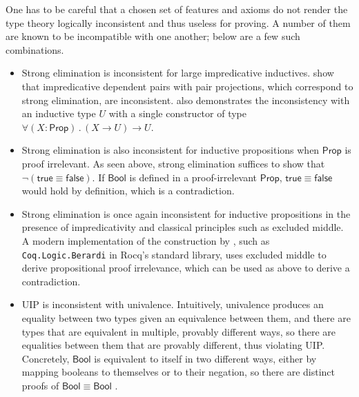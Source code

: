 \documentclass{article}
\newcommand{\kw}[1]{\mathsf{#1}}
\newcommand{\code}[1]{\texttt{#1}}
\begin{document}
One has to be careful that a chosen set of features and axioms
do not render the type theory logically inconsistent and thus useless for proving.
A number of them are known to be incompatible with one another;
below are a few such combinations.

\begin{itemize}[noitemsep,topsep=0pt]
  \item Strong elimination is inconsistent for large impredicative inductives.
    \citet{strong-pair} show that impredicative dependent pairs with pair projections,
    which correspond to strong elimination, are inconsistent.
    \citet{trees} also demonstrates the inconsistency with an inductive type $U$
    with a single constructor of type
    $\forall (X : \kw{Prop})\mathpunct{.} (X \to U) \to U$.
  \item Strong elimination is also inconsistent for inductive propositions
    when $\kw{Prop}$ is proof irrelevant.
    As seen above, strong elimination suffices to show that $\neg (\kw{true} \equiv \kw{false})$.
    If $\kw{Bool}$ is defined in a proof-irrelevant $\kw{Prop}$,
    $\kw{true} \equiv \kw{false}$ would hold by definition,
    which is a contradiction.
  \item Strong elimination is once again inconsistent for inductive propositions
    in the presence of impredicativity and classical principles such as excluded middle.
    A modern implementation of the construction by \cite{em-irr},
    such as \code{Coq.Logic.Berardi} in Rocq's standard library,
    uses excluded middle to derive propositional proof irrelevance,
    which can be used as above to derive a contradiction.
  \item UIP is inconsistent with univalence.
    Intuitively, univalence produces an equality between two types
    given an equivalence between them,
    and there are types that are equivalent in multiple, provably different ways,
    so there are equalities between them that are provably different,
    thus violating UIP.
    Concretely, $\kw{Bool}$ is equivalent to itself in two different ways,
    either by mapping booleans to themselves or to their negation,
    so there are distinct proofs of $\kw{Bool} \equiv \kw{Bool}$
    \citep[Example 3.1.9]{hott}.
\end{itemize}
\end{document}
